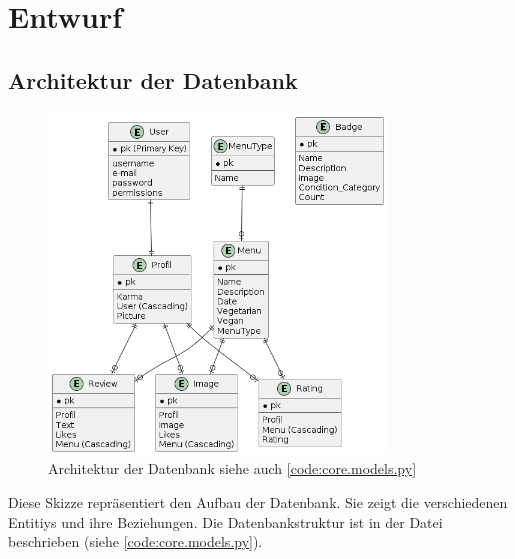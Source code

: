 \chapter{Entwurf} \label{chap:entwurf}
\section{Architektur der Datenbank} \label{sec:DB}
\begin{figure}[ht]
    \centering
    \includegraphics[width=0.8\textwidth]{images/Database.png}
    \caption{Architektur der Datenbank siehe auch \ref{code:core.models.py}}
    \label{fig:DB}
\end{figure}

Diese Skizze repräsentiert den Aufbau der Datenbank. Sie zeigt die verschiedenen
Entitiys und ihre Beziehungen. Die Datenbankstruktur ist in der Datei
 beschrieben (siehe \ref{code:core.models.py}).
